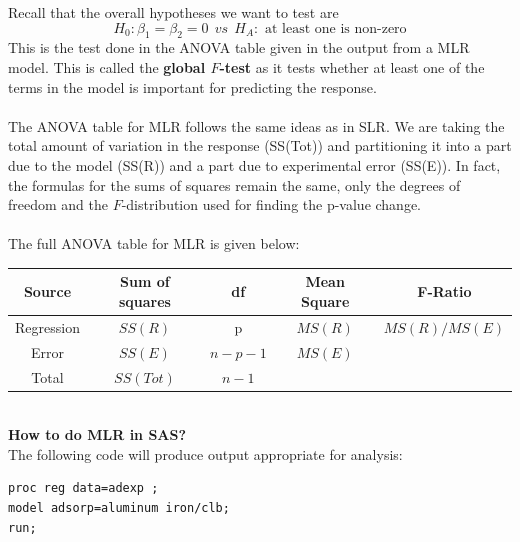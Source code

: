 \documentclass{article}
\begin{document}
\setlength{\topmargin}{0pt}
\setlength{\oddsidemargin}{0pt}

Recall that the overall hypotheses we want to test are
$$H_0: \beta_1=\beta_2=0 ~~vs~~H_A: \text{ at least one is non-zero}$$
This is the test done in the ANOVA table given in the output from a MLR model.  This is called the \textbf{global $F$-test} as it tests whether at least one of the terms in the model is important for predicting the response.\\~\\

The ANOVA table for MLR follows the same ideas as in SLR.  We are taking the total amount of variation in the response (SS(Tot)) and partitioning it into a part due to the model (SS(R)) and a part due to experimental error (SS(E)).  In fact, the formulas for the sums of squares remain the same, only the degrees of freedom and the $F$-distribution used for finding the p-value change.\\~\\

The full ANOVA table for MLR is given below:\\
\begin{tabular}{|c|c|c|c|c|} \hline
Source & Sum of squares & df & Mean Square & F-Ratio \\ \hline
Regression & $SS(R)$ & p & $MS(R)$ & $MS(R)/MS(E)$ \\
Error & $SS(E)$ & $n-p-1$ & $MS(E)$ &  \\
Total & $SS(Tot)$ & $n-1$ & &  \\ \hline
\end{tabular}
~\\
\textbf{How to do MLR in SAS?}\\
The following code will produce output appropriate for analysis:
\begin{small}
\begin{verbatim}
proc reg data=adexp ;
model adsorp=aluminum iron/clb;
run;
\end{verbatim}
\end{small}
\end{document}
